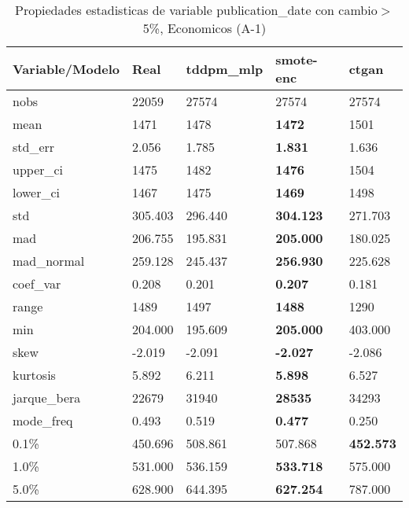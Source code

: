 \begin{table}[H]
\centering
\fontsize{8}{14}\selectfont
\caption{Propiedades estadisticas de variable publication\_date con cambio\ensuremath{>}5\%, Economicos (A-1)}
\label{table-stats-economicos-a-1-publication_date-short}
\begin{tabular}{|l|m{10em}|m{10em}|m{10em}|m{10em}|}
\hline
 \rowcolor[gray]{0.8}
Variable/Modelo & Real & tddpm\_mlp & smote-enc & ctgan \\
\hline nobs & 22059 & 27574 & 27574 & 27574 \\
\hline mean & 1471 & 1478 & \bfseries 1472 & \cellcolor[rgb]{0.9, 0.54, 0.52} 1501 \\
\hline std\_err & 2.056 & 1.785 & \bfseries 1.831 & \cellcolor[rgb]{0.9, 0.54, 0.52} 1.636 \\
\hline upper\_ci & 1475 & 1482 & \bfseries 1476 & \cellcolor[rgb]{0.9, 0.54, 0.52} 1504 \\
\hline lower\_ci & 1467 & 1475 & \bfseries 1469 & \cellcolor[rgb]{0.9, 0.54, 0.52} 1498 \\
\hline std & 305.403 & 296.440 & \bfseries 304.123 & \cellcolor[rgb]{0.9, 0.54, 0.52} 271.703 \\
\hline mad & 206.755 & 195.831 & \bfseries 205.000 & \cellcolor[rgb]{0.9, 0.54, 0.52} 180.025 \\
\hline mad\_normal & 259.128 & 245.437 & \bfseries 256.930 & \cellcolor[rgb]{0.9, 0.54, 0.52} 225.628 \\
\hline coef\_var & 0.208 & 0.201 & \bfseries 0.207 & \cellcolor[rgb]{0.9, 0.54, 0.52} 0.181 \\
\hline range & 1489 & 1497 & \bfseries 1488 & \cellcolor[rgb]{0.9, 0.54, 0.52} 1290 \\
\hline min & 204.000 & 195.609 & \bfseries 205.000 & \cellcolor[rgb]{0.9, 0.54, 0.52} 403.000 \\
\hline skew & -2.019 & \cellcolor[rgb]{0.9, 0.54, 0.52} -2.091 & \bfseries -2.027 & -2.086 \\
\hline kurtosis & 5.892 & 6.211 & \bfseries 5.898 & \cellcolor[rgb]{0.9, 0.54, 0.52} 6.527 \\
\hline jarque\_bera & 22679 & 31940 & \bfseries 28535 & \cellcolor[rgb]{0.9, 0.54, 0.52} 34293 \\
\hline mode\_freq & 0.493 & 0.519 & \bfseries 0.477 & \cellcolor[rgb]{0.9, 0.54, 0.52} 0.250 \\
\hline 0.1\% & 450.696 & \cellcolor[rgb]{0.9, 0.54, 0.52} 508.861 & 507.868 & \bfseries 452.573 \\
\hline 1.0\% & 531.000 & 536.159 & \bfseries 533.718 & \cellcolor[rgb]{0.9, 0.54, 0.52} 575.000 \\
\hline 5.0\% & 628.900 & 644.395 & \bfseries 627.254 & \cellcolor[rgb]{0.9, 0.54, 0.52} 787.000 \\
\hline
\end{tabular}
\end{table}
